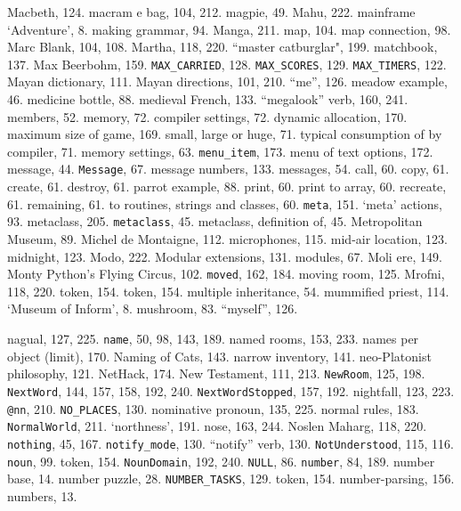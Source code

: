 Macbeth, 124.
macram{ e} bag, 104, 212.
magpie, 49.
Mahu, 222.
mainframe `Adventure', 8.
making grammar, 94.
Manga, 211.
map, 104.
map connection, 98.
Marc Blank, 104, 108.
Martha, 118, 220.
``master catburglar", 199.
matchbook, 137.
Max Beerbohm, 159.
{{\tt MAX\_CARRIED}}, 128.
{{\tt MAX\_SCORES}}, 129.
{{\tt MAX\_TIMERS}}, 122.
Mayan dictionary, 111.
Mayan directions, 101, 210.
``me'', 126.
meadow example, 46.
medicine bottle, 88.
medieval French, 133.
``megalook'' verb, 160, 241.
members, 52.
memory, 72.
\quad  compiler settings, 72.
\quad  dynamic allocation, 170.
\quad  maximum size of game, 169.
\quad  small, large or huge, 71.
\quad  typical consumption of by compiler, 71.
memory settings, 63.
{{\tt menu\_item}}, 173.
menu of text options, 172.
message, 44.
{{\tt Message}}, 67.
message numbers, 133.
messages, 54.
\quad  call, 60.
\quad  copy, 61.
\quad  create, 61.
\quad  destroy, 61.
\quad  parrot example, 88.
\quad  print, 60.
\quad  print to array, 60.
\quad  recreate, 61.
\quad  remaining, 61.
\quad  to routines, strings and classes, 60.
{{\tt meta}}, 151.
`meta' actions, 93.
metaclass, 205.
{{\tt metaclass}}, 45.
metaclass, definition of, 45.
Metropolitan Museum, 89.
Michel de Montaigne, 112.
microphones, 115.
mid-air location, 123.
midnight, 123.
Modo, 222.
Modular extensions, 131.
modules, 67.
Moli{ e}re, 149.
Monty Python's Flying Circus, 102.
{{\tt moved}}, 162, 184.
moving room, 125.
Mrofni, 118, 220.
 token, 154.
 token, 154.
multiple inheritance, 54.
mummified priest, 114.
`Museum of Inform', 8.
mushroom, 83.
``myself'', 126.

nagual, 127, 225.
{{\tt name}}, 50, 98, 143, 189.
named rooms, 153, 233.
names per object (limit), 170.
Naming of Cats, 143.
narrow inventory, 141.
neo-Platonist philosophy, 121.
NetHack, 174.
New Testament, 111, 213.
{{\tt NewRoom}}, 125, 198.
{{\tt NextWord}}, 144, 157, 158, 192, 240.
{{\tt NextWordStopped}}, 157, 192.
nightfall, 123, 223.
{{\tt @nn}}, 210.
{{\tt NO\_PLACES}}, 130.
nominative pronoun, 135, 225.
normal rules, 183.
{{\tt NormalWorld}}, 211.
`northness', 191.
nose, 163, 244.
Noslen Maharg, 118, 220.
{{\tt nothing}}, 45, 167.
{{\tt notify\_mode}}, 130.
``notify'' verb, 130.
{{\tt NotUnderstood}}, 115, 116.
{{\tt noun}}, 99.
 token, 154.
{{\tt NounDomain}}, 192, 240.
{{\tt NULL}}, 86.
{{\tt number}}, 84, 189.
number base, 14.
number puzzle, 28.
{{\tt NUMBER\_TASKS}}, 129.
 token, 154.
number-parsing, 156.
numbers, 13.

